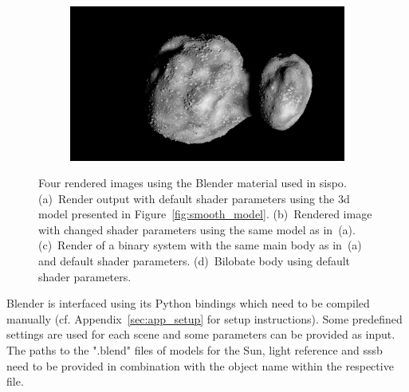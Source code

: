 \begin{figure}[htb]
\begin{subfigure}[b]{0.47\textwidth}
        \caption{}
        \label{fig:render_out_main_moon}
    \end{subfigure}
    \begin{subfigure}[b]{0.47\textwidth}
        \centering
        \includegraphics[width=\textwidth]{doc/thesis/0_figures/procedural_terrain/bilobe2.png}
        \caption{}
        \label{fig:render_out_bilobe}
    \end{subfigure}
    \caption{Four rendered images using the Blender material used in \gls{sispo}. (a)~Render output with default shader parameters using the \gls{3d} model presented in Figure~\ref{fig:smooth_model}. (b)~Rendered image with changed shader parameters using the same model as in~(a). (c)~Render of a binary system with the same main body as in~(a) and default shader parameters. (d)~Bilobate body using default shader parameters.}
    \label{fig:render_out}
\end{figure}

Blender is interfaced using its Python bindings which need to be compiled manually (cf. Appendix~\ref{sec:app_setup} for setup instructions). Some predefined settings are used for each scene and some parameters can be provided as input. The paths to the ".blend" files of models for the Sun, light reference and \gls{sssb} need to be provided in combination with the object name within the respective file.

